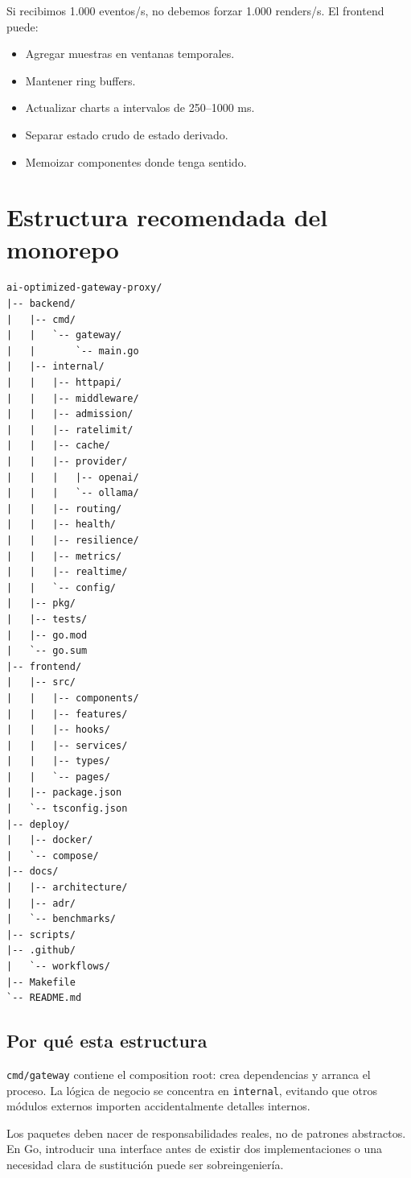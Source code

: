 \documentclass[11pt,a4paper]{article}
\newcommand{\code}[1]{\texttt{#1}}
\begin{document}
Si recibimos 1.000 eventos/s, no debemos forzar 1.000 renders/s. El frontend puede:

\begin{itemize}
  \item Agregar muestras en ventanas temporales.
  \item Mantener ring buffers.
  \item Actualizar charts a intervalos de 250--1000 ms.
  \item Separar estado crudo de estado derivado.
  \item Memoizar componentes donde tenga sentido.
\end{itemize}

\section{Estructura recomendada del monorepo}

\begin{verbatim}
ai-optimized-gateway-proxy/
|-- backend/
|   |-- cmd/
|   |   `-- gateway/
|   |       `-- main.go
|   |-- internal/
|   |   |-- httpapi/
|   |   |-- middleware/
|   |   |-- admission/
|   |   |-- ratelimit/
|   |   |-- cache/
|   |   |-- provider/
|   |   |   |-- openai/
|   |   |   `-- ollama/
|   |   |-- routing/
|   |   |-- health/
|   |   |-- resilience/
|   |   |-- metrics/
|   |   |-- realtime/
|   |   `-- config/
|   |-- pkg/
|   |-- tests/
|   |-- go.mod
|   `-- go.sum
|-- frontend/
|   |-- src/
|   |   |-- components/
|   |   |-- features/
|   |   |-- hooks/
|   |   |-- services/
|   |   |-- types/
|   |   `-- pages/
|   |-- package.json
|   `-- tsconfig.json
|-- deploy/
|   |-- docker/
|   `-- compose/
|-- docs/
|   |-- architecture/
|   |-- adr/
|   `-- benchmarks/
|-- scripts/
|-- .github/
|   `-- workflows/
|-- Makefile
`-- README.md
\end{verbatim}

\subsection{Por qué esta estructura}

\code{cmd/gateway} contiene el composition root: crea dependencias y arranca el proceso. La lógica de negocio se concentra en \code{internal}, evitando que otros módulos externos importen accidentalmente detalles internos.

Los paquetes deben nacer de responsabilidades reales, no de patrones abstractos. En Go, introducir una interface antes de existir dos implementaciones o una necesidad clara de sustitución puede ser sobreingeniería.
\end{document}
